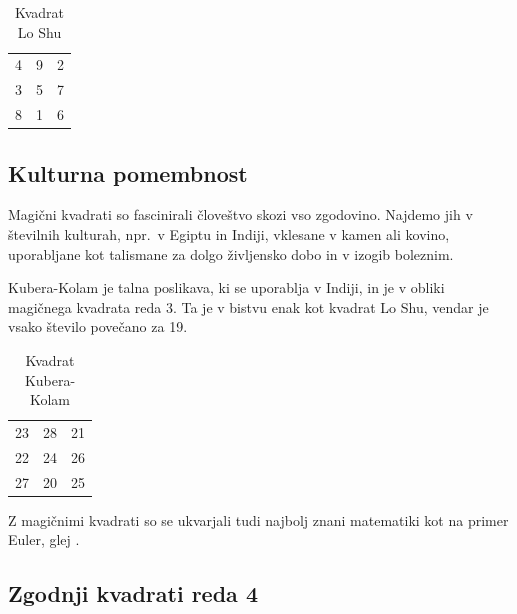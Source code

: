 \documentclass[a4paper,12pt]{article}
\newcommand{\pojem}[1]{\emph{}{\color{purple}#1}}
\begin{document}

\begin{table}
   \centering
   \caption{Kvadrat Lo Shu}
   \label{table:loshu}
\begin{tabular}{ccc}\toprule
        4 & 9 & 2 \\ 
        3 & 5 & 7 \\ 
        8 & 1 & 6 \\ \bottomrule
\end{tabular}
\end{table}


\subsection{Kulturna pomembnost}

Magični kvadrati so fascinirali človeštvo skozi vso zgodovino. Najdemo jih
v številnih kulturah, npr.\ v Egiptu in Indiji, vklesane v kamen ali
kovino, uporabljane kot talismane za dolgo življensko dobo in v
izogib boleznim.

\pojem{Kubera-Kolam} je talna poslikava, ki se uporablja v Indiji, in je v
obliki magičnega kvadrata reda 3. Ta je v bistvu enak kot kvadrat
Lo Shu, vendar je vsako število povečano za 19.

\begin{table}
   \centering
   \caption{Kvadrat Kubera-Kolam}
   \label{table:kubera}
\begin{tabular}{ccc}\toprule
        23 & 28 & 21 \\
        22 & 24 & 26 \\
        27 & 20 & 25 \\ \bottomrule
\end{tabular}
\end{table}

Z magičnimi kvadrati so se ukvarjali tudi najbolj znani matematiki kot na
primer Euler, glej \cite{euler}. %


\subsection{Zgodnji kvadrati reda 4}
\end{document}
